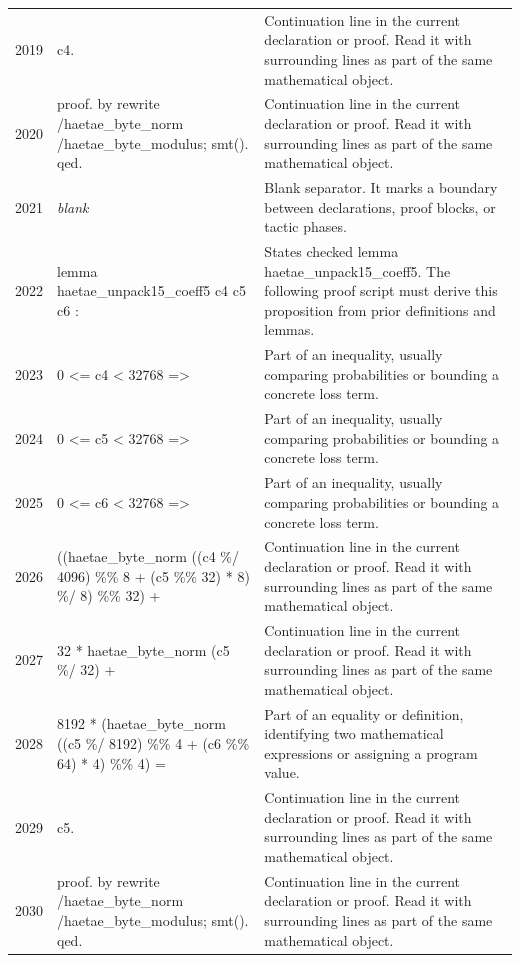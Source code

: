 \documentclass[10pt]{article}
\begin{document}
\begin{longtable}{r L{0.53\textwidth} L{0.37\textwidth}}
2019 & {\ttfamily\scriptsize   c4.} & Continuation line in the current declaration or proof.  Read it with surrounding lines as part of the same mathematical object. \\
2020 & {\ttfamily\scriptsize proof. by rewrite /haetae\_byte\_norm /haetae\_byte\_modulus; smt(). qed.} & Continuation line in the current declaration or proof.  Read it with surrounding lines as part of the same mathematical object. \\
2021 & {\ttfamily\scriptsize \emph{blank}} & Blank separator.  It marks a boundary between declarations, proof blocks, or tactic phases. \\
2022 & {\ttfamily\scriptsize lemma haetae\_unpack15\_coeff5 c4 c5 c6 :} & States checked lemma haetae\_unpack15\_coeff5.  The following proof script must derive this proposition from prior definitions and lemmas. \\
2023 & {\ttfamily\scriptsize   0 <= c4 < 32768 =>} & Part of an inequality, usually comparing probabilities or bounding a concrete loss term. \\
2024 & {\ttfamily\scriptsize   0 <= c5 < 32768 =>} & Part of an inequality, usually comparing probabilities or bounding a concrete loss term. \\
2025 & {\ttfamily\scriptsize   0 <= c6 < 32768 =>} & Part of an inequality, usually comparing probabilities or bounding a concrete loss term. \\
2026 & {\ttfamily\scriptsize   ((haetae\_byte\_norm ((c4 \%/ 4096) \%\% 8 + (c5 \%\% 32) * 8) \%/ 8) \%\% 32) +} & Continuation line in the current declaration or proof.  Read it with surrounding lines as part of the same mathematical object. \\
2027 & {\ttfamily\scriptsize     32 * haetae\_byte\_norm (c5 \%/ 32) +} & Continuation line in the current declaration or proof.  Read it with surrounding lines as part of the same mathematical object. \\
2028 & {\ttfamily\scriptsize     8192 * (haetae\_byte\_norm ((c5 \%/ 8192) \%\% 4 + (c6 \%\% 64) * 4) \%\% 4) =} & Part of an equality or definition, identifying two mathematical expressions or assigning a program value. \\
2029 & {\ttfamily\scriptsize   c5.} & Continuation line in the current declaration or proof.  Read it with surrounding lines as part of the same mathematical object. \\
2030 & {\ttfamily\scriptsize proof. by rewrite /haetae\_byte\_norm /haetae\_byte\_modulus; smt(). qed.} & Continuation line in the current declaration or proof.  Read it with surrounding lines as part of the same mathematical object. \\

\end{longtable}
\end{document}
